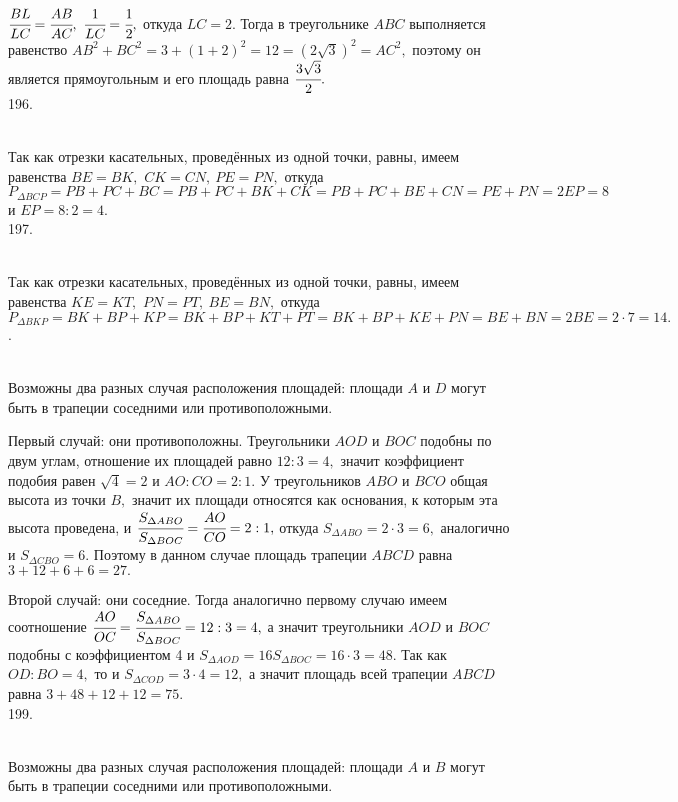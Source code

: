 $\cfrac{BL}{LC}=\cfrac{AB}{AC},\ \cfrac{1}{LC}=\cfrac{1}{2},$ откуда $LC=2.$ Тогда в треугольнике $ABC$ выполняется равенство $AB^2+BC^2=3+(1+2)^2=12=(2\sqrt{3})^2=AC^2,$ поэтому он является прямоугольным и его площадь равна $\cfrac{3\sqrt{3}}{2}.$\\
196. \begin{figure}[ht!]
\end{figure}\\
Так как отрезки касательных, проведённых из одной точки, равны, имеем равенства $BE=BK,$ $CK=CN,\ PE=PN,$ откуда $P_{\Delta BCP}=PB+PC+BC=PB+PC+BK+CK=
PB+PC+BE+CN=PE+PN=2EP=8$ и $EP=8:2=4.$\\
197. \begin{figure}[ht!]
\end{figure}\\
Так как отрезки касательных, проведённых из одной точки, равны, имеем равенства $KE=KT,$ $PN=PT,\ BE=BN,$ откуда $P_{\Delta BKP}=BK+BP+KP=BK+BP+KT+PT=
BK+BP+KE+PN=BE+BN=2BE=2\cdot7=14.$\newpage{}. \begin{figure}[ht!]
\end{figure}\\
Возможны два разных случая расположения площадей: площади $A$ и $D$ могут быть в трапеции соседними или противоположными.

Первый случай: они противоположны. Треугольники $AOD$ и $BOC$ подобны по двум углам, отношение их площадей равно $12:3=4,$ значит коэффициент подобия равен $\sqrt{4}=2$ и $AO:CO=2:1.$ У треугольников $ABO$ и $BCO$ общая высота из точки $B,$ значит их площади относятся как основания, к которым эта высота проведена, и $\cfrac{S_{\Delta ABO}}{S_{\Delta BOC}}=\cfrac{AO}{CO}=2:1,$ откуда $S_{\Delta ABO}=2\cdot3=6,$ аналогично и $S_{\Delta CBO}=6.$ Поэтому в данном случае площадь трапеции $ABCD$ равна $3+12+6+6=27.$

Второй случай: они соседние. Тогда аналогично первому случаю имеем соотношение $\cfrac{AO}{OC}=\cfrac{S_{\Delta ABO}}{S_{\Delta BOC}}=12:3=4,$ а значит треугольники $AOD$ и $BOC$ подобны с коэффициентом 4 и $S_{\Delta AOD}=16S_{\Delta BOC}=16\cdot3=48.$ Так как $OD:BO=4,$ то и $S_{\Delta COD}=3\cdot4=12,$ а значит площадь всей трапеции $ABCD$ равна $3+48+12+12=75.$\\
199. \begin{figure}[ht!]
\end{figure}\\
Возможны два разных случая расположения площадей: площади $A$ и $B$ могут быть в трапеции соседними или противоположными.

